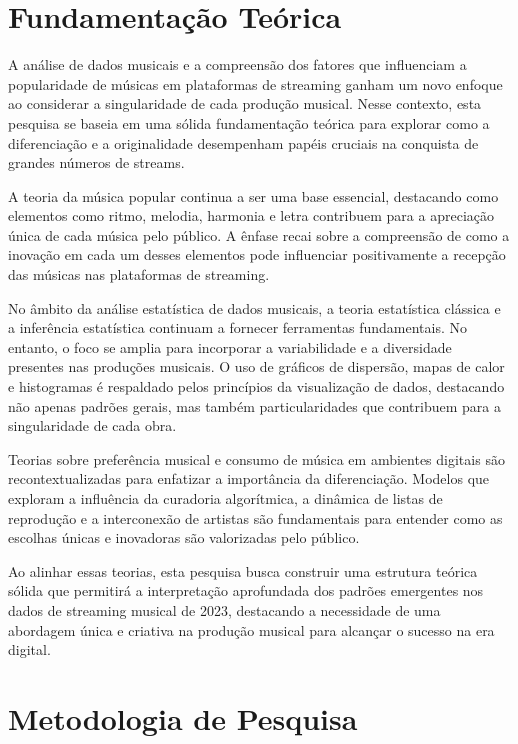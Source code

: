 \documentclass[12pt]{article}
\begin{document}
\section{Fundamentação Teórica} \label{sec:fundamentacao}

A análise de dados musicais e a compreensão dos fatores que influenciam a popularidade de músicas em plataformas de streaming ganham um novo enfoque ao considerar a singularidade de cada produção musical. Nesse contexto, esta pesquisa se baseia em uma sólida fundamentação teórica para explorar como a diferenciação e a originalidade desempenham papéis cruciais na conquista de grandes números de streams.

A teoria da música popular continua a ser uma base essencial, destacando como elementos como ritmo, melodia, harmonia e letra contribuem para a apreciação única de cada música pelo público\cite{silva2020}. A ênfase recai sobre a compreensão de como a inovação em cada um desses elementos pode influenciar positivamente a recepção das músicas nas plataformas de streaming.

No âmbito da análise estatística de dados musicais, a teoria estatística clássica e a inferência estatística continuam a fornecer ferramentas fundamentais. No entanto, o foco se amplia para incorporar a variabilidade e a diversidade presentes nas produções musicais. O uso de gráficos de dispersão, mapas de calor e histogramas é respaldado pelos princípios da visualização de dados, destacando não apenas padrões gerais, mas também particularidades que contribuem para a singularidade de cada obra.

Teorias sobre preferência musical e consumo de música em ambientes digitais são recontextualizadas para enfatizar a importância da diferenciação. Modelos que exploram a influência da curadoria algorítmica, a dinâmica de listas de reprodução e a interconexão de artistas são fundamentais para entender como as escolhas únicas e inovadoras são valorizadas pelo público.

Ao alinhar essas teorias, esta pesquisa busca construir uma estrutura teórica sólida que permitirá a interpretação aprofundada dos padrões emergentes nos dados de streaming musical de 2023, destacando a necessidade de uma abordagem única e criativa na produção musical para alcançar o sucesso na era digital.



\section{Metodologia de Pesquisa}
\end{document}
